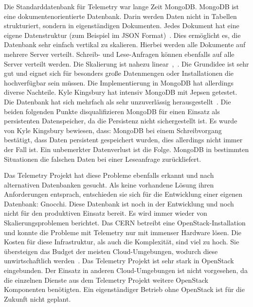 \begin{outline}
  \1 Die Standarddatenbank für Telemetry war lange Zeit MongoDB\@. MongoDB ist
  eine dokumentenorientierte Datenbank. Darin werden Daten nicht in Tabellen
  strukturiert, sondern in eigenständigen Dokumenten. Jedes Dokument hat eine
  eigene Datenstruktur (zum Beispiel im \gls{JSON}
  Format)~\cite{Dokumentenorientierte_Datenbank}. Dies ermöglicht es, die
  Datenbank sehr einfach vertikal zu skalieren. Hierbei werden alle Dokumente
  auf mehrere Server verteilt. Schreib- und Lese-Anfragen können ebenfalls auf
  alle Server verteilt werden. Die Skalierung ist nahezu
  linear~\cite{MongoDB_Architecture},~\cite{What_is_MongoDB}. Die Grundidee ist
  sehr gut und eignet sich für besonders große Datenmengen oder Installationen
  die hochverfügbar sein müssen. Die Implementierung in MongoDB hat allerdings
  diverse Nachteile. Kyle Kingsbury hat intensiv MongoDB mit \gls{Jepsen}
  getestet. Die Datenbank hat sich mehrfach als sehr unzuverlässig
  herausgestellt~\cite{MongoDB_on_Jepsen}. Die beiden folgenden Punkte
  disqualifizieren MongoDB für einen Einsatz als persistenten Datenspeicher,
  da die Persistenz nicht sichergestellt ist. Es wurde von Kyle Kingsbury
  bewiesen, dass:
    \2 MongoDB bei einem Schreibvorgang bestätigt, dass Daten persistent
    gespeichert wurden, dies allerdings nicht immer der Fall ist. Ein
    unbemerkter Datenverlust ist die Folge.
    \2 MongoDB in bestimmten Situationen die falschen Daten bei einer
    Leseanfrage zurückliefert.

  \1 Das Telemetry Projekt hat diese Probleme ebenfalls erkannt und nach
  alternativen Datenbanken gesucht. Als keine vorhandene Lösung ihren
  Anforderungen entsprach, entschieden sie sich für die Entwicklung einer
  eigenen Datenbank: \gls{Gnocchi}. Diese Datenbank ist noch in der Entwicklung
  und noch nicht für den produktiven Einsatz bereit.
  \1 Es wird immer wieder von Skalierungsproblemen berichtet. Das CERN betreibt
  eine OpenStack-Installation und konnte die Probleme mit Telemetry nur mit
  immenser Hardware lösen. Die Kosten für diese Infrastruktur, als auch die
  Komplexität, sind viel zu hoch. Sie übersteigen das Budget der meisten
  Cloud-Umgebungen, wodurch diese unwirtschaftlich werden~\cite{OpenStack_CERN}.
  \1 Das Telemetry Projekt ist sehr stark in OpenStack eingebunden. Der Einsatz
  in anderen Cloud-Umgebungen ist nicht vorgesehen, da die einzelnen Dienste
  aus dem Telemetry Projekt weitere OpenStack Komponenten benötigten. Ein
  eigenständiger Betrieb ohne OpenStack ist für die Zukunft nicht geplant.
\end{outline}

